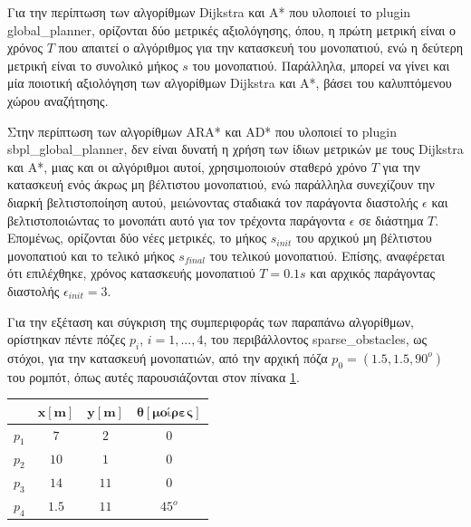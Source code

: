 \bigskip
Για την περίπτωση των αλγορίθμων Dijkstra και A* που υλοποιεί το plugin global{\_}planner, ορίζονται δύο μετρικές αξιολόγησης, όπου, η πρώτη μετρική είναι ο χρόνος $T$ που απαιτεί ο αλγόριθμος για την κατασκευή του μονοπατιού, ενώ η δεύτερη μετρική είναι το συνολικό μήκος $s$ του μονοπατιού. Παράλληλα, μπορεί να γίνει και μία ποιοτική αξιολόγηση των αλγορίθμων Dijkstra και A*, βάσει του καλυπτόμενου χώρου αναζήτησης.

\bigskip
Στην περίπτωση των αλγορίθμων ARA* και AD* που υλοποιεί το plugin sbpl{\_}global{\_}planner, δεν είναι δυνατή η χρήση των ίδιων μετρικών με τους Dijkstra και A*, μιας και οι αλγόριθμοι αυτοί, χρησιμοποιούν σταθερό χρόνο $T$ για την κατασκευή ενός άκρως μη βέλτιστου μονοπατιού, ενώ παράλληλα συνεχίζουν την διαρκή βελτιστοποίηση αυτού, μειώνοντας σταδιακά τον παράγοντα διαστολής $\epsilon$ και βελτιστοποιώντας το μονοπάτι αυτό για τον τρέχοντα παράγοντα $\epsilon$ σε διάστημα $T$. Επομένως, ορίζονται δύο νέες μετρικές, το μήκος $s_{init}$ του αρχικού μη βέλτιστου μονοπατιού και το τελικό μήκος $s_{final}$ του τελικού μονοπατιού. Επίσης, αναφέρεται ότι επιλέχθηκε, χρόνος κατασκευής μονοπατιού $T=0.1s$ και αρχικός παράγοντας διαστολής $\epsilon_{init}=3$. 

\bigskip
Για την εξέταση και σύγκριση της συμπεριφοράς των παραπάνω αλγορίθμων, ορίστηκαν πέντε πόζες $p_i$, $i=1,...,4$, του περιβάλλοντος sparse{\_}obstacles, ως στόχοι, για την κατασκευή μονοπατιών, από την αρχική πόζα $p_0 = (1.5, 1.5, 90^o)$ του ρομπότ, όπως αυτές παρουσιάζονται στον πίνακα \ref{tab:path_planning_target_poses}.

\bigskip 
\begin{table}[!ht]
	\centering
	\label{tab:path_planning_target_poses}
	\begin{tabular}{| c | c  c  c |} \hline
	 	& $\mathbf{x[m]}$ & $\mathbf{y[m]}$ & $\mathbf{\theta[μοίρες]}$  \\ \hline
 	   $p_1$ & $7$ & $2$ & $0$\\ 
  	   $p_2$ & $10$ & $1$ & $0$\\ 
   	   $p_3$ & $14$ & $11$ & $0$\\ 
		$p_4$ & $1.5$ & $11$ & $45^o$\\ \hline
   	\end{tabular}
\end{table}

